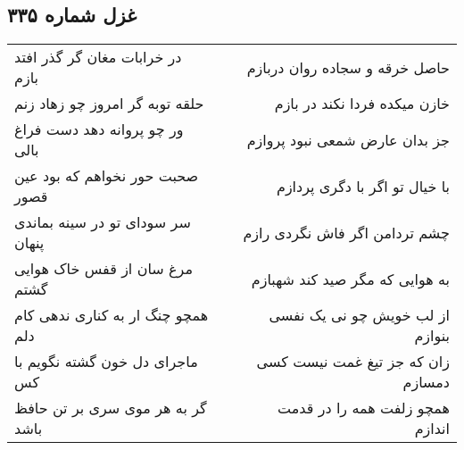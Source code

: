 \begin{center}
\section*{غزل شماره ۳۳۵}
\label{sec:sh335}
\begin{longtable}{l p{0.5cm} r}
در خرابات مغان گر گذر افتد بازم
&&
حاصل خرقه و سجاده روان دربازم
\\
حلقه توبه گر امروز چو زهاد زنم
&&
خازن میکده فردا نکند در بازم
\\
ور چو پروانه دهد دست فراغ بالی
&&
جز بدان عارض شمعی نبود پروازم
\\
صحبت حور نخواهم که بود عین قصور
&&
با خیال تو اگر با دگری پردازم
\\
سر سودای تو در سینه بماندی پنهان
&&
چشم تردامن اگر فاش نگردی رازم
\\
مرغ سان از قفس خاک هوایی گشتم
&&
به هوایی که مگر صید کند شهبازم
\\
همچو چنگ ار به کناری ندهی کام دلم
&&
از لب خویش چو نی یک نفسی بنوازم
\\
ماجرای دل خون گشته نگویم با کس
&&
زان که جز تیغ غمت نیست کسی دمسازم
\\
گر به هر موی سری بر تن حافظ باشد
&&
همچو زلفت همه را در قدمت اندازم
\\
\end{longtable}
\end{center}
